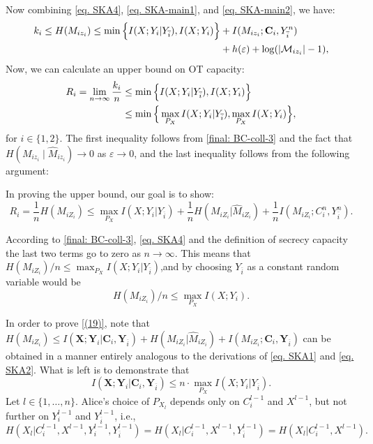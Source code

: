 \documentclass[runningheads]{llncs}
\newcommand{\parbreak}{ \vspace{0.3 em}}
\begin{document}
\parbreak Now combining \eqref{eq. SKA4}, \eqref{eq. SKA-main1}, and \eqref{eq. SKA-main2}, we have:
\begin{align}
    k_i \leq H(M_{iz_i}) \leq \min \Big\{ I(X; Y_i | Y_{\overline{i}}), I(X; Y_i)\Big\} &+ I(M_{i{z}_i};\mathbf{C}_i, Y_{\overline{i}}^n)\notag\\
    & + h(\varepsilon) + \log (|\mathcal{M}_{iz_i}|-1),
\end{align}
Now, we can calculate an upper bound on OT capacity:
\begin{align}
    R_i = \lim_{n\to\infty} \frac{k_i}{n} &\leq \min \Big\{ I(X; Y_i | Y_{\overline{i}}), I(X; Y_i)\Big\}\notag\\
    & \leq \min \Big\{ \max_{P_X} I(X; Y_i | Y_{\overline{i}}), \max_{P_X} I(X; Y_i)\Big\},
\end{align}
for $i\in\{1,2\}$. The first inequality follows from \eqref{final: BC-coll-3} and the fact that $H(M_{iz_i} \mid \hat{M}_{iz_i}) \to 0$ as $\varepsilon \to 0$, and the last inequality follows from the following argument:


In proving the upper bound, our goal is to show:
\begin{equation}\label{(19)}
R_i = \frac{1}{n} H(M_{iZ_i}) \leq \max_{P_X} I(X;Y_i|Y_{\overline{i}}) + \frac{1}{n} H(M_{iZ_i}|\hat{M}_{iZ_i}) 
+ \frac{1}{n} I(M_{iZ_i}; C_i^n ,Y_{\overline{i}}^n). 
\end{equation}

According to \eqref{final: BC-coll-3}, \eqref{eq. SKA4} and the definition of secrecy capacity the last two terms go to zero as $n \to \infty$.  
This means that  $H(M_{iZ_i})/n \leq \max_{P_X} I(X;Y_i|Y_{\overline{i}})$,and by choosing $Y_{\overline{i}}$ as a constant random variable would be \[
H(M_{iZ_i})/n \leq \max_{P_X} I(X;Y_i).
\]

\parbreak In order to prove \eqref{(19)}, note that $H(M_{iZ_i}) \leq I(\mathbf{X}; \mathbf{Y}_i | \mathbf{C}_i ,\mathbf{Y}_{\overline{i}}) +  H(M_{iZ_i}|\hat{M}_{iZ_i})
+ I(M_{iZ_i}; \mathbf{C}_i ,\mathbf{Y}_{\overline{i}})$
can be obtained in a manner entirely analogous to the derivations of \eqref{eq. SKA1} and \eqref{eq. SKA2}. What is left is to demonstrate that
\begin{equation}\label{main}
I(\mathbf{X}; \mathbf{Y}_i | \mathbf{C}_i, \mathbf{Y}_{\overline{i}}) \leq n \cdot \max_{P_X} I(X; Y_i | Y_{\overline{i}}). 
\end{equation}
Let $l\in\{1,\ldots, n\}$.  
Alice’s choice of $P_{X_l}$ depends only on $C_i^{l-1}$ and $X^{l-1}$, but not further on $Y_i^{l-1}$ and $Y_{\overline{i}}^{l-1}$, i.e.,
\begin{equation}\label{(21)}
H(X_l | C_i^{l-1}, X^{l-1}, Y_i^{l-1}, Y_{\overline{i}}^{l-1}) = H(X_l | C_i^{l-1}, X^{l-1}, Y_{\overline{i}}^{l-1}) 
= H(X_l | C_i^{l-1}, X^{l-1}). 
\end{equation}
\end{document}
